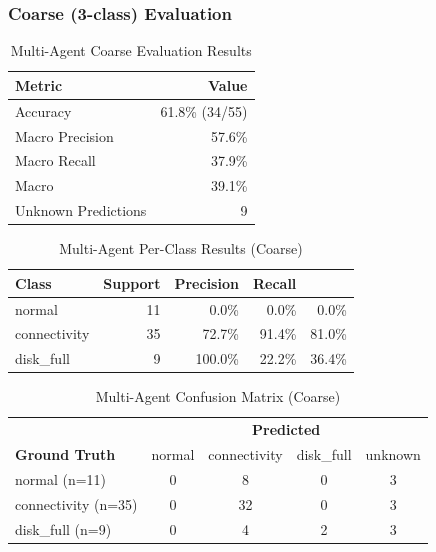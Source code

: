 \subsubsection{Coarse (3-class) Evaluation}

\begin{table}[H]
\centering
\caption{Multi-Agent Coarse Evaluation Results}
\label{tab:ma-coarse}
\begin{tabular}{lr}
\toprule
\textbf{Metric} & \textbf{Value} \\
\midrule
Accuracy            & 61.8\% (34/55) \\
Macro Precision     & 57.6\% \\
Macro Recall        & 37.9\% \\
Macro \fone{}       & 39.1\% \\
Unknown Predictions & 9 \\
\bottomrule
\end{tabular}
\end{table}

\begin{table}[H]
\centering
\caption{Multi-Agent Per-Class Results (Coarse)}
\label{tab:ma-coarse-perclass}
\begin{tabular}{lrrrr}
\toprule
\textbf{Class} & \textbf{Support} & \textbf{Precision} & \textbf{Recall} & \textbf{\fone{}} \\
\midrule
normal       & 11 & 0.0\%   & 0.0\%   & 0.0\%  \\
connectivity & 35 & 72.7\%  & 91.4\%  & 81.0\% \\
disk\_full   & 9  & 100.0\% & 22.2\%  & 36.4\% \\
\bottomrule
\end{tabular}
\end{table}

\begin{table}[H]
\centering
\caption{Multi-Agent Confusion Matrix (Coarse)}
\label{tab:ma-cm-coarse}
\begin{tabular}{l|cccc}
\toprule
& \multicolumn{4}{c}{\textbf{Predicted}} \\
\textbf{Ground Truth} & normal & connectivity & disk\_full & unknown \\
\midrule
normal (n=11)       & 0 & 8  & 0 & 3 \\
connectivity (n=35) & 0 & 32 & 0 & 3 \\
disk\_full (n=9)    & 0 & 4  & 2 & 3 \\
\bottomrule
\end{tabular}
\end{table}

